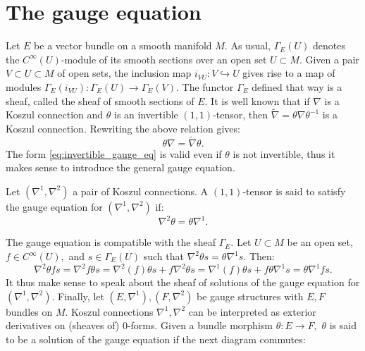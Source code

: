 \section{The gauge equation}
Let $E$ be a vector bundle on a smooth manifold $M.$ As usual, $\Gamma_E(U)$ denotes the $C^\infty(U)$-module of its smooth sections over an open set $U \subset M.$ Given a pair $V \subset U \subset M$ of open sets, the inclusion map $i_{VU} \colon V \hookrightarrow U$ gives rise to a map of modules $\Gamma_E(i_{VU}) \colon \Gamma_E(U) \to \Gamma_E(V).$ The functor $\Gamma_E$ defined that way is a sheaf, called the sheaf of smooth sections of $E.$
It is well known \cite{husemoller1994} that if $\nabla$ is a Koszul connection and $\theta$ is an invertible $(1,1)$-tensor, then $\tilde{\nabla} = \theta \nabla \theta^{-1}$ is a Koszul connection.
Rewriting the above relation gives:
\begin{equation}
    \label{eq:invertible_gauge_eq}
    \theta \nabla = \tilde{\nabla} \theta.
\end{equation}
The form \ref{eq:invertible_gauge_eq} is valid even if $\theta$ is not invertible, thus it makes sense to introduce the general gauge equation.
\begin{defn}
Let $\left(\nabla^1,\nabla^2\right)$ a pair of Koszul connections. A $(1,1)$-tensor is said to satisfy the gauge equation for $\left(\nabla^1,\nabla^2\right)$ if:
\begin{equation}
\label{eq:gauge_eq}
\nabla^2 \theta = \theta \nabla^1.
\end{equation}
\end{defn}
    The gauge equation is compatible with the sheaf $\Gamma_E.$ Let $U \subset M$ be an open set, $f \in C^\infty(U),$ and $s \in \Gamma_E(U)$ such that $\nabla^2 \theta s = \theta \nabla^1 s.$
    Then:
    \begin{equation}
        \label{eq:sheaf_gauge_equation}
        \nabla^2 \theta f s = \nabla^2 f \theta s  = \nabla^2(f) \theta s + f \nabla^2 \theta s 
        = \nabla^1(f) \theta s  + f \theta \nabla^1 s 
         = \theta \nabla^1 f s.
    \end{equation}
It thus make sense to speak about the sheaf of solutions of the gauge equation for $\left(\nabla^1, \nabla^2 \right).$
Finally, let $\left(E, \nabla^1 \right), \left(F, \nabla^2 \right)$ be gauge structures with $E,F$ bundles on $M$. Koszul connections $\nabla^1,\nabla^2$ can be interpreted as exterior derivatives on (sheaves of) 0-forms. Given a bundle morphism $\theta \colon  E \to F,$ $\theta$ is said to be a solution of the gauge equation if the next diagram commutes:
